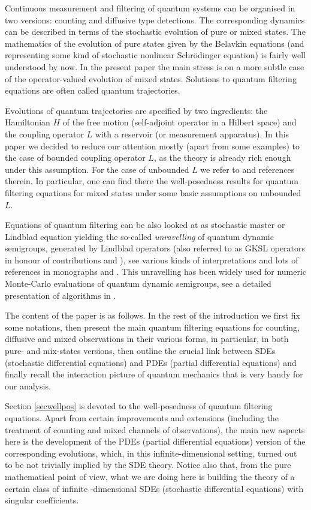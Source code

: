 \documentclass[12pt]{article}
\begin{document}
Continuous measurement and filtering of quantum systems can be organised in two versions:
counting and diffusive type detections.
The corresponding dynamics can be described in terms of the stochastic evolution of pure or mixed states.
The mathematics of the evolution of pure states given by the Belavkin equations (and representing some kind
of stochastic nonlinear Schr\"odinger equation) is fairly well understood by now. In the present paper
the main stress is on a more subtle case of the operator-valued evolution of mixed states.
Solutions to quantum filtering equations are often called quantum trajectories.


Evolutions of quantum trajectories are specified by two ingredients: the Hamiltonian $H$ of the free motion
(self-adjoint operator in a Hilbert space) and the coupling operator $L$ with a reservoir
(or measurement apparatus). In this paper we decided to reduce our attention mostly
(apart from some examples) to the case of bounded coupling operator $L$, as the theory
is already rich enough under this assumption. For the case of unbounded $L$ we refer to
\cite{Kol25b} and references therein. In particular, one can find there the well-posedness results
for quantum filtering equations for mixed states under some basic assumptions on
unbounded $L$.


Equations of quantum filtering can be also looked at as stochastic master or Lindblad
 equation yielding the so-called {\it unravelling} of quantum dynamic semigroups, generated by Lindblad
 operators (also referred to as GKSL operators in honour of contributions \cite{GKS} and \cite{Lindblad}),
see various kinds of interpretations and lots of references in monographs \cite{BarchBook} and \cite{Breuer}.
This unravelling has been widely used for numeric Monte-Carlo evaluations of quantum dynamic
semigroups, see a detailed presentation of algorithms in \cite{Breuer}.

The content of the paper is as follows. In the rest of the introduction we first fix
some notations, then present the main quantum filtering equations for counting,
 diffusive and mixed observations in their various forms, in particular, in both  pure- and
 mix-states versions, then outline the crucial link
 between SDEs (stochastic differential equations) and PDEs (partial differential equations)
 and finally recall the interaction picture of quantum mechanics that is very handy for
 our analysis.

 Section \ref{secwellpos} is devoted to the well-posedness of quantum
 filtering equations. Apart from certain improvements and extensions
 (including the treatment of counting and mixed channels of observations),
 the main new aspects here is the development of the PDEs (partial
 differential equations) version of the corresponding evolutions,
 which, in this infinite-dimensional setting, turned out to be not trivially implied by the SDE theory.
Notice also that, from the pure mathematical point of view, what we are doing here is
building the theory of a certain class of infinite -dimensional SDEs (stochastic differential equations)
with singular coefficients.
\end{document}
